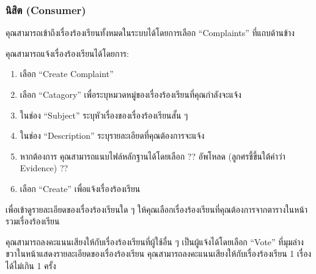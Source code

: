 \blindtext[3]

\subsubsection{นิสิต (Consumer)}\label{subsubsec:role-usage-consumer}



คุณสามารถเข้าถึงเรื่องร้องเรียนทั้งหมดในระบบได้โดยการเลือก ``Complaints'' ที่แถบด้านข้าง

\pagebreak[3]


คุณสามารถแจ้งเรื่องร้องเรียนได้โดยการ:

\begin{enumerate}
    \item เลือก ``Create Complaint''
    \item เลือก ``Catagory'' เพื่อระบุหมวดหมู่ของเรื่องร้องเรียนที่คุณกำลังจะแจ้ง
    \item ในช่อง ``Subject'' ระบุหัวเรื่องของเรื่องร้องเรียนสั้น ๆ
    \item ในช่อง ``Description'' ระบุรายละเอียดที่คุณต้องการจะแจ้ง
    \item หากต้องการ คุณสามารถแนบไฟล์หลักฐานได้โดยเลือก ?? อัพโหลด (ลูกศรชี้ขึ้นใต้คำว่า Evidence) ??
    \item เลือก ``Create'' เพื่อแจ้งเรื่องร้องเรียน
\end{enumerate}

\pagebreak[3]



เพื่อเข้าดูรายละเอียดของเรื่องร้องเรียนใด ๆ ให้คุณเลือกเรื่องร้องเรียนที่คุณต้องการจากตารางในหน้ารวมเรื่องร้องเรียน

\pagebreak[3]



คุณสามารถลงคะแนนเสียงให้กับเรื่องร้องเรียนที่ผู้ใช้อื่น ๆ เป็นผู้แจ้งได้โดยเลือก ``Vote''
ที่มุมล่างขวาในหน้าแสดงรายละเอียดของเรื่องร้องเรียน
คุณสามารถลงคะแนนเสียงให้กับเรื่องร้องเรียน 1 เรื่องได้ไม่เกิน 1 ครั้ง

\pagebreak[4]
